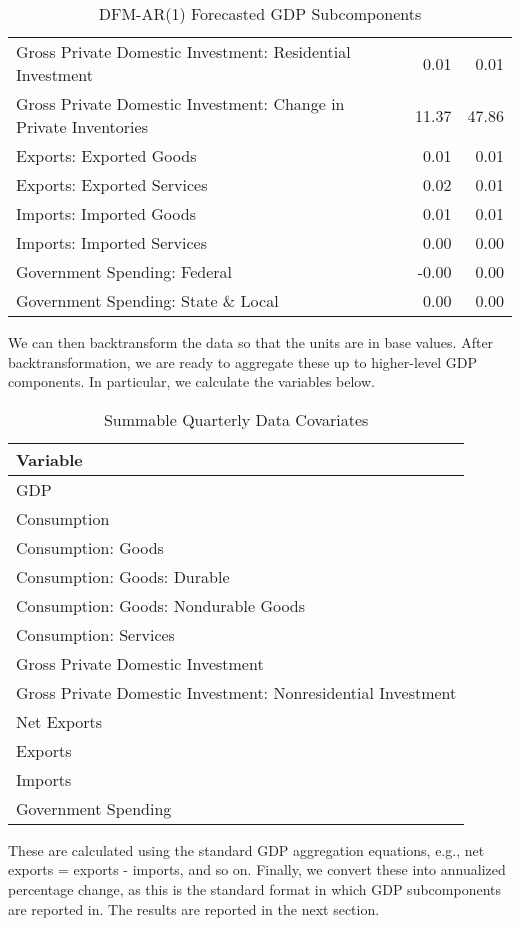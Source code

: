 \documentclass[11pt, letterpaper]{article}\usepackage[]{graphicx}\usepackage[]{color}
\begin{document}
\begin{table}[H]
\begin{tabular}{lrrr}
  Gross Private Domestic Investment: Residential Investment &  & 0.01 & 0.01 \\ 
  Gross Private Domestic Investment: Change in Private Inventories &  & 11.37 & 47.86 \\ 
  Exports: Exported Goods &  & 0.01 & 0.01 \\ 
  Exports: Exported Services &  & 0.02 & 0.01 \\ 
  Imports: Imported Goods &  & 0.01 & 0.01 \\ 
  Imports: Imported Services &  & 0.00 & 0.00 \\ 
  Government Spending: Federal &  & -0.00 & 0.00 \\ 
  Government Spending: State \& Local &  & 0.00 & 0.00 \\ 
   \hline
\end{tabular}
\endgroup
\caption{DFM-AR(1) Forecasted GDP Subcomponents} 
\end{table}


We can then backtransform the data so that the units are in base values. After backtransformation, we are ready to aggregate these up to higher-level GDP components. In particular, we calculate the variables below.
\begin{table}[H]
\centering
\begingroup\scriptsize
\begin{tabular}{l}
  \hline
Variable \\ 
  \hline
GDP \\ 
  Consumption \\ 
  Consumption: Goods \\ 
  Consumption: Goods: Durable \\ 
  Consumption: Goods: Nondurable Goods \\ 
  Consumption: Services \\ 
  Gross Private Domestic Investment \\ 
  Gross Private Domestic Investment: Nonresidential Investment \\ 
  Net Exports \\ 
  Exports \\ 
  Imports \\ 
  Government Spending \\ 
   \hline
\end{tabular}
\endgroup
\caption{Summable Quarterly Data Covariates} 
\end{table}

These are calculated using the standard GDP aggregation equations, e.g., net exports = exports - imports, and so on.
Finally, we convert these into annualized percentage change, as this is the standard format in which GDP subcomponents are reported in. The results are reported in the next section.
\end{document}

